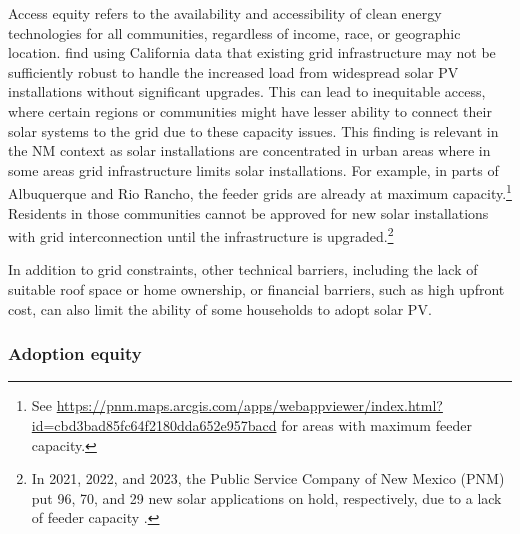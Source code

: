 \documentclass[12pt,twoside,letterpaper]{article}
\begin{document}
 Access equity refers to the availability and accessibility of clean energy technologies for all communities, regardless of income, race, or geographic location. \textcite{brockway_inequitable_2021} find using California data that existing grid infrastructure may not be sufficiently robust to handle the increased load from widespread solar PV installations without significant upgrades. This can lead to inequitable access, where certain regions or communities might have lesser ability to connect their solar systems to the grid due to these capacity issues. This finding is relevant in the NM context as solar installations are concentrated in urban areas where in some areas grid infrastructure limits solar installations. For example, in parts of Albuquerque and Rio Rancho, the feeder grids are already at maximum capacity.\footnote{See \url{https://pnm.maps.arcgis.com/apps/webappviewer/index.html?id=cbd3bad85fc64f2180dda652e957bacd} for areas with maximum feeder capacity.} Residents in those communities cannot be approved for new solar installations with grid interconnection until the infrastructure is upgraded.\footnote{In 2021, 2022, and 2023, the Public Service Company of New Mexico (PNM) put 96, 70, and 29 new solar applications on hold, respectively, due to a lack of feeder capacity \parencite{pnm2021,pnm2022,pnm2023}. }

 In addition to grid constraints, other technical barriers, including the lack of suitable roof space or home ownership, or financial barriers, such as high upfront cost, can also limit the ability of some households to adopt solar PV.
 
 \subsubsection{Adoption equity}
\end{document}
